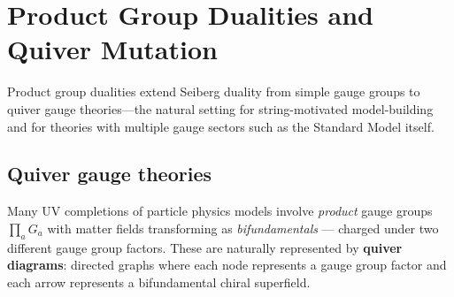 \documentclass[11pt,a4paper]{article}
\begin{document}
\section{Product Group Dualities and Quiver Mutation}
\label{sec:product-groups}

Product group dualities extend Seiberg duality from simple gauge groups
to quiver gauge theories---the natural setting for string-motivated
model-building and for theories with multiple gauge sectors such as the
Standard Model itself.

\subsection{Quiver gauge theories}

Many UV completions of particle physics models involve \emph{product}
gauge groups $\prod_a G_a$ with matter fields transforming as
\emph{bifundamentals} --- charged under two different gauge group
factors.  These are naturally represented by \textbf{quiver diagrams}:
directed graphs where each node represents a gauge group factor and
each arrow represents a bifundamental chiral superfield.

\begin{center}
\end{center}
\end{document}
